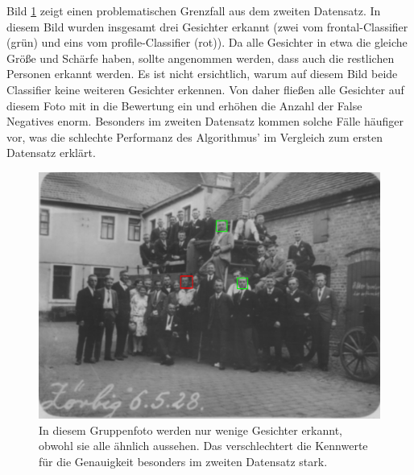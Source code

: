 Bild \ref{fig:pos_ex2} zeigt einen problematischen Grenzfall aus dem zweiten Datensatz. In diesem Bild wurden insgesamt drei Gesichter erkannt (zwei vom frontal-Classifier (grün) und eins vom profile-Classifier (rot)). Da alle Gesichter in etwa die gleiche Größe und Schärfe haben, sollte angenommen werden, dass auch die restlichen Personen erkannt werden. Es ist nicht ersichtlich, warum auf diesem Bild beide Classifier keine weiteren Gesichter erkennen. Von daher fließen alle Gesichter auf diesem Foto mit in die Bewertung ein und erhöhen die Anzahl der False Negatives enorm. Besonders im zweiten Datensatz kommen solche Fälle häufiger vor, was die schlechte Performanz des Algorithmus' im Vergleich zum ersten Datensatz erklärt.
\begin{figure}[h]
	\centering
	\includegraphics[width=0.75\linewidth]{images/examples_groundtruth/positive/16_1.png}
	\caption{In diesem Gruppenfoto werden nur wenige Gesichter erkannt, obwohl sie alle ähnlich aussehen. Das verschlechtert die Kennwerte für die Genauigkeit besonders im zweiten Datensatz stark.}
	\label{fig:pos_ex2}
\end{figure}